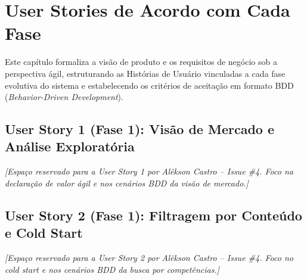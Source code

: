 %

\section{User Stories de Acordo com Cada Fase}
\label{sec:user_stories}

Este capítulo formaliza a visão de produto e os requisitos de negócio sob a perspectiva ágil, estruturando as Histórias de Usuário vinculadas a cada fase evolutiva do sistema e estabelecendo os critérios de aceitação em formato BDD (\textit{Behavior-Driven Development}).

\subsection{User Story 1 (Fase 1): Visão de Mercado e Análise Exploratória}
\label{sec:us1_mercado}

\noindent\textit{[Espaço reservado para a User Story 1 por Alêkson Castro -- Issue \#4. Foco na declaração de valor ágil e nos cenários BDD da visão de mercado.]}

\subsection{User Story 2 (Fase 1): Filtragem por Conteúdo e Cold Start}
\label{sec:us2_cold_start}

\noindent\textit{[Espaço reservado para a User Story 2 por Alêkson Castro -- Issue \#4. Foco no cold start e nos cenários BDD da busca por competências.]}


